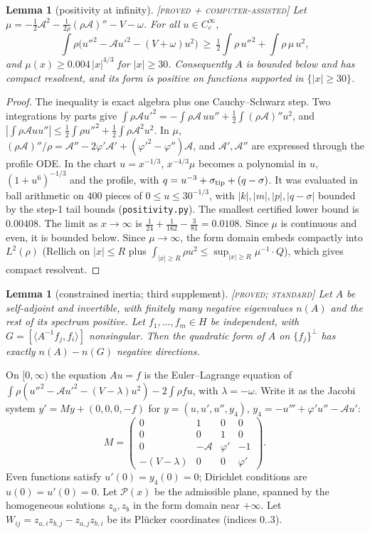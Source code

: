 \documentclass[11pt]{amsart}
\newtheorem{lemma}[theorem]{Lemma}
\theoremstyle{definition}
\theoremstyle{remark}
\newcommand{\ip}[2]{\langle #1,#2\rangle}
\newcommand{\lab}[1]{\textup{\textsc{[#1]}}}
\newcommand{\stip}{\sigma_{\rm tip}}
\begin{document}
\begin{lemma}[positivity at infinity]\label{lem:infty}\lab{proved + computer-assisted}
Let $\mu=-\frac12\mathcal A^2-\frac1{2\rho}(\rho\mathcal A)''-V-\omega$. For all $u\in C_c^\infty$,
\[
\int\rho\big(u''^2-\mathcal Au'^2-(V+\omega)u^2\big)\ \ge\ \tfrac12\int\rho\,u''^2+\int\rho\,\mu\,u^2 ,
\]
and $\mu(x)\ge0.004\,|x|^{4/3}$ for $|x|\ge30$. Consequently $A$ is bounded below and has compact resolvent, and its form is positive on functions supported in $\{|x|\ge30\}$.
\end{lemma}
\begin{proof}
The inequality is exact algebra plus one Cauchy--Schwarz step. Two integrations by parts give $\int\rho\mathcal Au'^2=-\int\rho\mathcal A\,uu''+\frac12\int(\rho\mathcal A)''u^2$, and $|\int\rho\mathcal A uu''|\le\frac12\int\rho u''^2+\frac12\int\rho\mathcal A^2u^2$. In $\mu$, $(\rho\mathcal A)''/\rho=\mathcal A''-2\varphi'\mathcal A'+(\varphi'^2-\varphi'')\mathcal A$, and $\mathcal A',\mathcal A''$ are expressed through the profile ODE. In the chart $u=x^{-1/3}$, $x^{-4/3}\mu$ becomes a polynomial in $u$, $(1+u^6)^{-1/3}$ and the profile, with $q=u^{-3}+\stip+(q-\sigma)$. It was evaluated in ball arithmetic on $400$ pieces of $0\le u\le30^{-1/3}$, with $|k|,|m|,|p|,|q-\sigma|$ bounded by the step-1 tail bounds (\texttt{positivity.py}). The smallest certified lower bound is $0.00408$. The limit as $x\to\infty$ is $\frac1{24}+\frac1{162}-\frac3{81}=0.0108$. Since $\mu$ is continuous and even, it is bounded below. Since $\mu\to\infty$, the form domain embeds compactly into $L^2(\rho)$ (Rellich on $|x|\le R$ plus $\int_{|x|\ge R}\rho u^2\le\sup_{|x|\ge R}\mu^{-1}\cdot Q$), which gives compact resolvent.
\end{proof}

\begin{lemma}[constrained inertia; third supplement]\label{lem:inertia}\lab{proved; standard}
Let $A$ be self-adjoint and invertible, with finitely many negative eigenvalues $n(A)$ and the rest of its spectrum positive. Let $f_1,\dots,f_m\in H$ be independent, with $G=[\ip{A^{-1}f_j}{f_i}]$ nonsingular. Then the quadratic form of $A$ on $\{f_j\}^\perp$ has exactly $n(A)-n(G)$ negative directions.
\end{lemma}

On $[0,\infty)$ the equation $Au=f$ is the Euler--Lagrange equation of $\int\rho(u''^2-\mathcal A u'^2-(V-\lambda)u^2)-2\int\rho fu$, with $\lambda=-\omega$. Write it as the Jacobi system $y'=My+(0,0,0,-f)$ for $y=(u,u',u'',y_4)$, $y_4=-u'''+\varphi'u''-\mathcal Au'$:
\[
M=\begin{pmatrix}0&1&0&0\\0&0&1&0\\0&-\mathcal A&\varphi'&-1\\-(V-\lambda)&0&0&\varphi'\end{pmatrix}.
\]
Even functions satisfy $u'(0)=y_4(0)=0$; Dirichlet conditions are $u(0)=u'(0)=0$. Let $\mathcal P(x)$ be the admissible plane, spanned by the homogeneous solutions $z_a,z_b$ in the form domain near $+\infty$. Let $W_{ij}=z_{a,i}z_{b,j}-z_{a,j}z_{b,i}$ be its Pl\"ucker coordinates (indices $0..3$).
\end{document}
